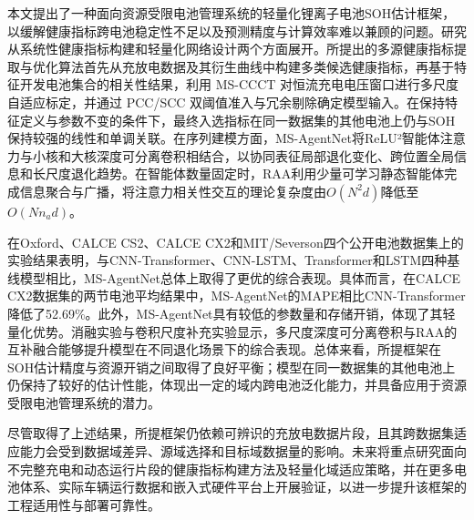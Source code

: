 本文提出了一种面向资源受限电池管理系统的轻量化锂离子电池SOH估计框架，以缓解健康指标跨电池稳定性不足以及预测精度与计算效率难以兼顾的问题。研究从系统性健康指标构建和轻量化网络设计两个方面展开。所提出的多源健康指标提取与优化算法首先从充放电数据及其衍生曲线中构建多类候选健康指标，再基于特征开发电池集合的相关性结果，利用 MS-CCCT 对恒流充电电压窗口进行多尺度自适应标定，并通过 PCC/SCC 双阈值准入与冗余剔除确定模型输入。在保持特征定义与参数不变的条件下，最终入选指标在同一数据集的其他电池上仍与SOH保持较强的线性和单调关联。在序列建模方面，MS-AgentNet将ReLU²智能体注意力与小核和大核深度可分离卷积相结合，以协同表征局部退化变化、跨位置全局信息和长尺度退化趋势。在智能体数量固定时，RAA利用少量可学习静态智能体完成信息聚合与广播，将注意力相关性交互的理论复杂度由$O(N^2d)$降低至$O(Nn_a d)$。

在Oxford、CALCE CS2、CALCE CX2和MIT/Severson四个公开电池数据集上的实验结果表明，与CNN-Transformer、CNN-LSTM、Transformer和LSTM四种基线模型相比，MS-AgentNet总体上取得了更优的综合表现。具体而言，在CALCE CX2数据集的两节电池平均结果中，MS-AgentNet的MAPE相比CNN-Transformer降低了52.69\%。此外，MS-AgentNet具有较低的参数量和存储开销，体现了其轻量化优势。消融实验与卷积尺度补充实验显示，多尺度深度可分离卷积与RAA的互补融合能够提升模型在不同退化场景下的综合表现。总体来看，所提框架在SOH估计精度与资源开销之间取得了良好平衡；模型在同一数据集的其他电池上仍保持了较好的估计性能，体现出一定的域内跨电池泛化能力，并具备应用于资源受限电池管理系统的潜力。

尽管取得了上述结果，所提框架仍依赖可辨识的充放电数据片段，且其跨数据集适应能力会受到数据域差异、源域选择和目标域数据量的影响。未来将重点研究面向不完整充电和动态运行片段的健康指标构建方法及轻量化域适应策略，并在更多电池体系、实际车辆运行数据和嵌入式硬件平台上开展验证，以进一步提升该框架的工程适用性与部署可靠性。
